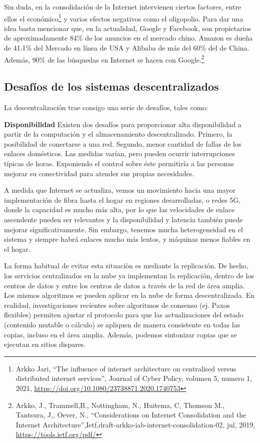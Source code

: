 \documentclass[12pt]{report} %
\begin{document}
Sin duda, en la consolidación de la Internet intervienen ciertos factores, entre ellos el económico\footnote{Arkko Jari, “The influence of internet architecture on centralised versus distributed internet services”, Journal of Cyber Policy, volumen 5, numero 1, 2021, \url{https://doi.org/10.1080/23738871.2020.1740753}} y varios efectos negativos como el oligopolio.  Para dar una idea basta mencionar que, en la actualidad, Google y Facebook, son propietarios de aproximadamente 84\% de los anuncios en el mercado chino. Amazon es dueña de 41.1\% del Mercado en línea de USA y Alibaba de más del 60\% del de China. Además, 90\% de las búsquedas en Internet se hacen con Google.\footnote{Arkko, J., Trammell,B., Nottingham, N., Huitema, C, Thomson M., Tantsura, J,, Oever, N., “Considerations on Internet Consolidation and the Internet Architecture”,Ietf,draft-arkko-iab-internet-consolidation-02, jul, 2019, \url{https://tools.ietf.org/pdf/}} 

\subsection{Desafíos de los sistemas descentralizados}

La descentralización trae consigo una serie de desafíos, tales como:

\textbf{Disponibilidad} Existen dos desafíos para proporcionar alta disponibilidad a partir de la computación y el almacenamiento descentralizado. Primero, la posibilidad de conectarse a una red. Segundo, menor cantidad de fallas de los enlaces domésticos. Las medidas varían, pero pueden ocurrir interrupciones típicas de horas. Exponiendo el control sobre éste permitiría a las personas mejorar su conectividad para atender sus propias necesidades.

A medida que Internet se actualiza, vemos un movimiento hacia una mayor implementación de fibra hasta el hogar en regiones desarrolladas, o redes 5G, donde la capacidad es mucho más alta, por lo que las velocidades de enlace ascendente pueden ser relevantes y la disponibilidad y latencia también puede mejorar significativamente. Sin embargo, tenemos mucha heterogeneidad en el sistema y siempre habrá enlaces mucho más lentos, y máquinas menos fiables en el hogar.

La forma habitual de evitar esta situaciòn es mediante la replicación. De hecho, los servicios centralizados en la nube ya implementan la replicación, dentro de los centros de datos y entre los centros de datos a través de la red de área amplia. Los mismos algoritmos se pueden aplicar en la nube de forma descentralizada. En realidad, investigaciones recientes sobre algoritmos de consenso (ej. Paxos flexibles) permiten ajustar el protocolo para que las actualizaciones del estado (contenido mutable o cálculo) se apliquen de manera consistente en todas las copias, incluso en el área amplia. Además, podemos sintonizar copias que se ejecutan en sitios dispares. 
\end{document}
